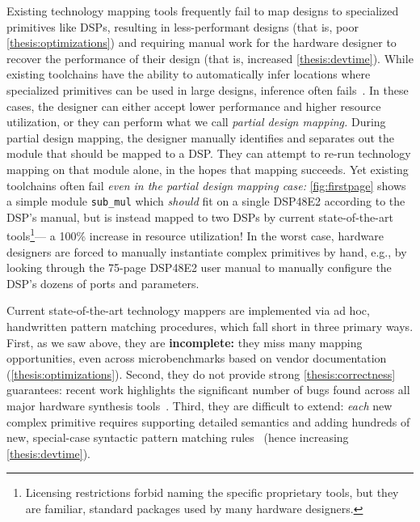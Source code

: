 Existing technology mapping tools
  frequently fail to map designs
  to
  specialized primitives like DSPs,
  resulting in less-performant designs
  (that is, poor \cref{thesis:optimizations})
  and
  requiring manual work for the hardware designer
  to recover the performance of their design
  (that is, increased \cref{thesis:devtime}).
While existing toolchains
  have the ability to automatically infer
  locations where specialized primitives
  can be used in large designs,
  inference often fails~\cite{xilinxforum1,xilinxforum2,inferringreddit}.
In these cases, the designer can either
  accept lower performance and higher resource
  utilization,
  or they can perform
  what we call
  \textit{partial design mapping.}
During partial design mapping, 
  the designer
  manually identifies and separates out
  the module that should be mapped
  to a DSP.
They can attempt to re-run technology mapping
  on that module alone,
  in the hopes that mapping succeeds.
Yet existing toolchains often fail
  \textit{even in the partial design mapping case:}
  \cref{fig:firstpage} shows a
  simple module
  \texttt{sub\_mul}
  which \textit{should} fit on a single DSP48E2
  according to the DSP's manual,
  but is instead mapped to 
  two DSPs by current 
  state-of-the-art tools\footnote{
    Licensing restrictions forbid naming the
    specific proprietary tools, but they are familiar,
    standard packages used by many hardware designers.
  }---%
  a 100\% increase in resource utilization!
In the worst case,
  hardware designers are forced to manually
  instantiate complex primitives by hand,
  e.g., by looking through the 75-page
  DSP48E2 user manual
  to manually configure the DSP's dozens
  of ports and parameters.

Current state-of-the-art
  technology mappers 
  are implemented via
  ad hoc, handwritten pattern matching procedures,
  which
  fall short in three primary ways.
First,
  as we saw above,
  they are \textbf{incomplete:}
  they miss many mapping opportunities,
  even across microbenchmarks based on vendor documentation
  (\cref{thesis:optimizations}).
Second, they do not provide strong \cref{thesis:correctness} guarantees:
  recent work highlights the significant number of bugs found across 
  all major hardware synthesis tools~\cite{herklotz2020finding}.
Third, they are difficult to extend:
  \textit{each} new complex primitive requires
  supporting detailed semantics
  and adding hundreds of new, special-case
  syntactic pattern matching rules~\cite{wolf2013yosys}
  (hence increasing \cref{thesis:devtime}).


